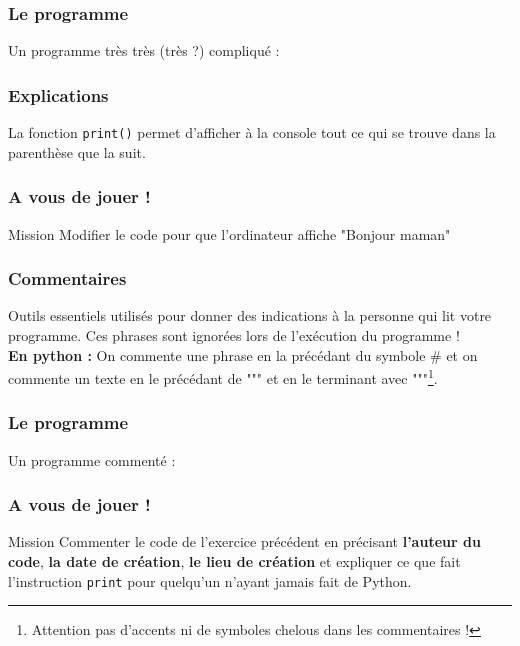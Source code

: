 \documentclass[handout]{beamer}
\begin{document}

\begin{frame}
\frametitle{Le programme}
Un programme très très (très ?) compliqué :
    \helloworld
\end{frame}

\begin{frame}
\frametitle{Explications}
    La fonction \texttt{print()} permet d'afficher à la console tout ce qui se trouve dans la parenthèse que la suit.
\end{frame}

\begin{frame}
\frametitle{A vous de jouer !}
    \begin{block}{Mission}
    Modifier le code pour que l'ordinateur affiche "Bonjour maman"
    \end{block}
\end{frame}

\begin{frame}
\frametitle{Commentaires}
    Outils essentiels utilisés pour donner des indications à la personne qui lit votre programme. Ces phrases sont ignorées lors de l'exécution du programme ! \\
    \textbf{En python : }On commente une phrase en la précédant du symbole \# et on commente un texte en le précédant de """ et en le terminant avec """\footnote{Attention pas d'accents ni de symboles chelous dans les commentaires !}.
\end{frame}

\begin{frame}
\frametitle{Le programme}
Un programme commenté :
    \comm
\end{frame}
\begin{frame}
\frametitle{A vous de jouer !}
    \begin{block}{Mission}
    Commenter le code de l'exercice précédent en précisant \textbf{l'auteur du code}, \textbf{la date de création}, \textbf{le lieu de création} et expliquer ce que fait l'instruction \texttt{print} pour quelqu'un n'ayant jamais fait de Python. 
    \end{block}
\end{frame}
\end{document}
